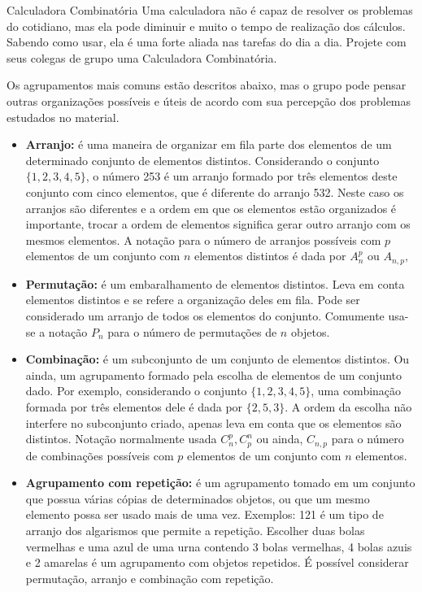 \begin{task}{Calculadora Combinatória}
Uma calculadora não é capaz de resolver os problemas do cotidiano, mas ela pode diminuir e muito o tempo de realização dos cálculos. Sabendo como usar, ela é uma forte aliada nas tarefas do dia a dia. Projete com seus colegas de grupo uma Calculadora Combinatória.



Os agrupamentos mais comuns estão descritos abaixo, mas o grupo pode pensar outras organizações possíveis e úteis de acordo com sua percepção dos problemas estudados no material.

\begin{itemize}
\item \textbf{Arranjo:}  é uma maneira de organizar em fila parte dos elementos de um determinado conjunto de elementos distintos. Considerando o conjunto $\{1,2,3,4,5\}$, o número 253 é um arranjo formado por três elementos deste conjunto com cinco elementos, que é diferente do arranjo 532. Neste caso os arranjos são diferentes e a ordem em que os elementos estão organizados é importante, trocar a ordem de elementos significa gerar outro arranjo com os mesmos elementos. A notação para o número de arranjos possíveis com $p$ elementos de um conjunto com $n$ elementos distintos é  dada por $A_n^p$ ou  $A_{n,p},$ 


\item \textbf{Permutação:} é um embaralhamento de elementos distintos. Leva em conta elementos distintos e se refere a organização deles em fila. Pode ser considerado um arranjo de todos os elementos do conjunto. Comumente usa-se a notação $P_n$ para o número de permutações de $n$ objetos. 


\item \textbf{Combinação:} é um subconjunto de um conjunto de elementos distintos. Ou ainda, um agrupamento formado pela escolha de elementos de um conjunto dado. Por exemplo, considerando o conjunto $\{1,2,3,4,5\}$, uma combinação formada por três elementos dele é dada por $\{2,5,3\}$. A ordem da escolha não interfere no subconjunto criado, apenas leva em conta que os elementos são distintos.  Notação normalmente usada $C_n^p,C_p^n$ ou ainda, $C_{n,p}$ para o número de combinações possíveis com $p$ elementos de um conjunto com $n$ elementos. 


\item \textbf{Agrupamento com repetição:} é um agrupamento tomado em um conjunto que possua várias cópias de determinados objetos, ou que um mesmo elemento possa ser usado mais de uma vez. Exemplos: 121 é um tipo de arranjo dos algarismos que permite a repetição.  Escolher duas bolas vermelhas e uma azul de uma urna contendo 3 bolas vermelhas, 4 bolas azuis e 2 amarelas é um agrupamento com objetos repetidos. É possível considerar permutação, arranjo e combinação com repetição. 
\end{itemize}



\end{task}
